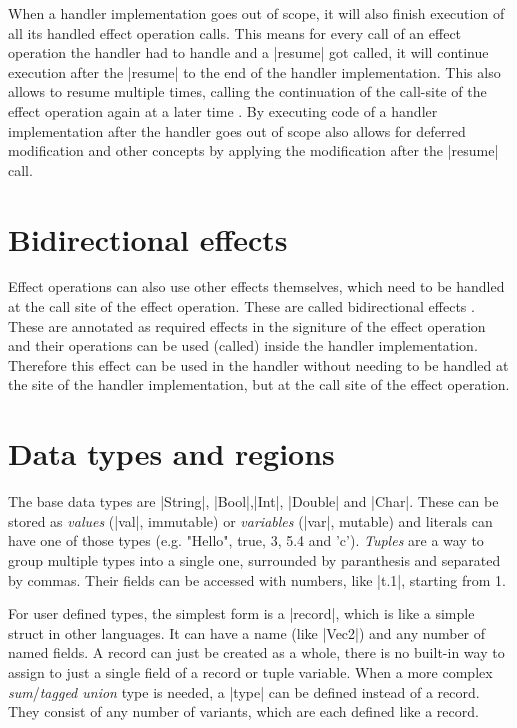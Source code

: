 When a handler implementation goes out of scope, it will also finish execution of all its handled effect operation calls. This means for every call of an effect operation the handler had to handle and a |resume| got called, it will continue execution after the |resume| to the end of the handler implementation. This also allows to resume multiple times, calling the continuation of the call-site of the effect operation again at a later time \cite{brachthauser2020effects}. By executing code of a handler implementation after the handler goes out of scope also allows for deferred modification and other concepts by applying the modification after the |resume| call.

\section{Bidirectional effects}

Effect operations can also use other effects themselves, which need to be handled at the call site of the effect operation. These are called bidirectional effects \cite{zhang2020bidirectional}. These are annotated as required effects in the signiture of the effect operation and their operations can be used (called) inside the handler implementation. Therefore this effect can be used in the handler without needing to be handled at the site of the handler implementation, but at the call site of the effect operation.

\section{Data types and regions}

The base data types are |String|, |Bool|,|Int|, |Double| and |Char|. These can be stored as \textit{values} (|val|, immutable) or \textit{variables} (|var|, mutable) and literals can have one of those types (e.g. "Hello", true, 3, 5.4 and 'c'). \textit{Tuples} are a way to group multiple types into a single one, surrounded by paranthesis and separated by commas. Their fields can be accessed with numbers, like |t.1|, starting from 1.

For user defined types, the simplest form is a |record|, which is like a simple struct in other languages. It can have a name (like |Vec2|) and any number of named fields. A record can just be created as a whole, there is no built-in way to assign to just a single field of a record or tuple variable. When a more complex \textit{sum}/\textit{tagged union} type is needed, a |type| can be defined instead of a record. They consist of any number of variants, which are each defined like a record.


